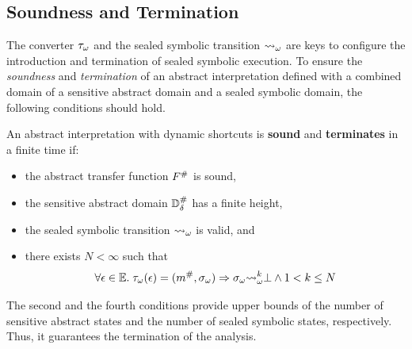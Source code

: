 \subsection{Soundness and Termination}
The converter ${\tau}_\omega$ and the sealed symbolic transition ${\leadsto}_\omega$ are
keys to configure the introduction and termination of sealed symbolic
execution.  To ensure the \textit{soundness} and \textit{termination} of an
abstract interpretation defined with a combined domain of a sensitive abstract
domain and a sealed symbolic domain, the following conditions should hold.

\begin{theorem}\label{theorem:shortcut}
An abstract interpretation with dynamic shortcuts is \textbf{sound} and
\textbf{terminates} in a finite time if:
  \begin{itemize}
    \item the abstract transfer function ${F}^{\#}$ is sound,
    \item the sensitive abstract domain ${\mathbb{D}}^{\#}_\delta$ has a finite height,
    \item the sealed symbolic transition ${\leadsto}_\omega$ is valid, and
    \item there exists $N < \infty$ such that
      \[
        \forall \epsilon \in \mathbb{E}. \; {\tau}_\omega(\epsilon) = ({m}^{\#},
        {\sigma}_\omega) \Rightarrow {\sigma}_\omega
        {\leadsto}_\omega^k \bot \wedge 1 < k \leq N
      \]
  \end{itemize}
\end{theorem}

The second and the fourth conditions provide upper bounds of
the number of sensitive abstract states and
the number of sealed symbolic states, respectively.
Thus, it guarantees the termination of the analysis.

